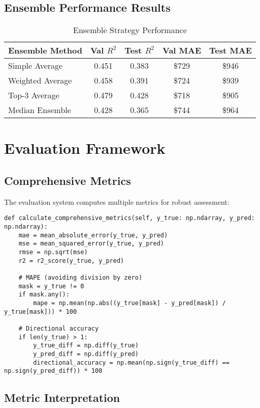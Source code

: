 \documentclass[12pt,a4paper]{article}
\begin{document}
\subsection{Ensemble Performance Results}

\begin{table}[h]
\centering
\begin{tabular}{@{}lcccc@{}}
\toprule
\textbf{Ensemble Method} & \textbf{Val $R^2$} & \textbf{Test $R^2$} & \textbf{Val MAE} & \textbf{Test MAE} \\
\midrule
Simple Average & 0.451 & 0.383 & \$729 & \$946 \\
Weighted Average & 0.458 & 0.391 & \$724 & \$939 \\
Top-3 Average & 0.479 & 0.428 & \$718 & \$905 \\
Median Ensemble & 0.428 & 0.365 & \$744 & \$964 \\
\bottomrule
\end{tabular}
\caption{Ensemble Strategy Performance}
\end{table}

\section{Evaluation Framework}

\subsection{Comprehensive Metrics}

The evaluation system computes multiple metrics for robust assessment:

\begin{lstlisting}[caption=Comprehensive Metrics Calculation]
def calculate_comprehensive_metrics(self, y_true: np.ndarray, y_pred: np.ndarray):
    mae = mean_absolute_error(y_true, y_pred)
    mse = mean_squared_error(y_true, y_pred)
    rmse = np.sqrt(mse)
    r2 = r2_score(y_true, y_pred)
    
    # MAPE (avoiding division by zero)
    mask = y_true != 0
    if mask.any():
        mape = np.mean(np.abs((y_true[mask] - y_pred[mask]) / y_true[mask])) * 100
    
    # Directional accuracy
    if len(y_true) > 1:
        y_true_diff = np.diff(y_true)
        y_pred_diff = np.diff(y_pred)
        directional_accuracy = np.mean(np.sign(y_true_diff) == np.sign(y_pred_diff)) * 100
\end{lstlisting}

\subsection{Metric Interpretation}
\end{document}
